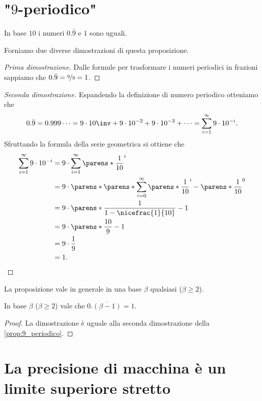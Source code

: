 \section{"$9$-periodico"}

\begin{proposition}
    [$9$-periodico]
    \label{prop:9_periodico}
    In base $10$ i numeri $0.\bar{9}$ e $1$ sono uguali. 
\end{proposition}
Forniamo due diverse dimostrazioni di questa proposizione.
\begin{proof}
    [Prima dimostrazione]
    Dalle formule per trasformare i numeri periodici in frazioni sappiamo che $0.\bar{9} = \nicefrac{9}{9} = 1$. 
\end{proof}
\begin{proof}
    [Seconda dimostrazione]
    Espandendo la definizione di numero periodico otteniamo che \[
        0.\bar{9} = 0.999\dots = 9\cdot10\inv + 9\cdot10^{-2} + 9\cdot 10^{-3} + \dots = \sum_{i=1}^\infty 9\cdot10^{-i}.
    \] Sfruttando la formula della serie geometrica si ottiene che \begin{align*}
        \sum_{i=1}^\infty 9\cdot10^{-i} &= 9 \cdot \sum_{i=1}^\infty \parens*{\frac{1}{10}}^i\\
        &= 9 \cdot \parens*{\parens*{\sum_{i=0}^\infty \parens*{\frac{1}{10}}^i} - \parens*{\frac{1}{10}}^0}\\
        &= 9 \cdot \parens*{\frac{1}{1-\nicefrac{1}{10}} - 1}\\
        &= 9 \cdot \parens*{\frac{10}{9} - 1}\\
        &= 9 \cdot \frac{1}{9}\\
        &= 1. \qedhere
    \end{align*}
\end{proof}

La proposizione vale in generale in una base $\beta$ qualsiasi ($\beta \geq 2$).
\begin{proposition}
    In base $\beta$ ($\beta \geq 2$) vale che $0.\overline{(\beta-1)} = 1$.  
\end{proposition}
\begin{proof}
    La dimostrazione è uguale alla seconda dimostrazione della \autoref{prop:9_periodico}.
\end{proof}

\section{La precisione di macchina è un limite superiore stretto}
\label{sez:machine_prec_>}

